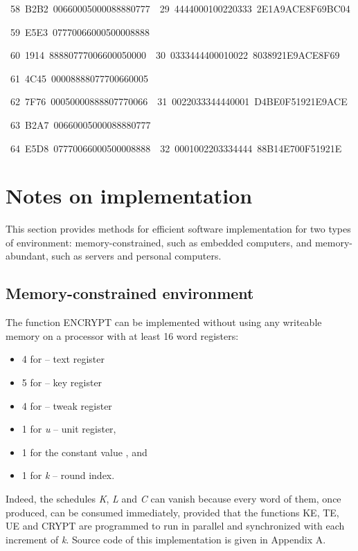 \documentclass[a4paper,oneside,english]{amsart}
\numberwithin{equation}{section}
\numberwithin{figure}{section}
\newenvironment{lyxcode}
{\par\begin{list}{}{
\setlength{\rightmargin}{\leftmargin}
\setlength{\listparindent}{0pt}\raggedright
\setlength{\itemsep}{0pt}
\setlength{\parsep}{0pt}
\normalfont\ttfamily}\item[]}
{\end{list}}
\begin{document}
\begin{table}
\begin{lyxcode}
{\footnotesize{}~58~B2B2~00660005000088880777~~29~4444000100220333~2E1A9ACE8F69BC04}{\footnotesize \par}

{\footnotesize{}~59~E5E3~07770066000500008888}{\footnotesize \par}

{\footnotesize{}~60~1914~88880777006600050000~~30~0333444400010022~8038921E9ACE8F69}{\footnotesize \par}

{\footnotesize{}~61~4C45~00008888077700660005}{\footnotesize \par}

{\footnotesize{}~62~7F76~00050000888807770066~~31~0022033344440001~D4BE0F51921E9ACE}{\footnotesize \par}

{\footnotesize{}~63~B2A7~00660005000088880777}{\footnotesize \par}

{\footnotesize{}~64~E5D8~07770066000500008888~~32~0001002203334444~88B14E700F51921E}{\footnotesize \par}

\end{lyxcode}
\end{table}



\section{Notes on implementation}

This section provides methods for efficient software implementation
for two types of environment: memory-constrained, such as embedded
computers, and memory-abundant, such as servers and personal computers.


\subsection{Memory-constrained environment}

The function ENCRYPT can be implemented without using any writeable
memory on a processor with at least 16 word registers:
\begin{itemize}
\item 4 for  -- text register
\item 5 for  -- key register
\item 4 for  -- tweak register
\item 1 for \emph{u} -- unit register, 
\item 1 for the constant value , and
\item 1 for \emph{k} -- round index.
\end{itemize}
Indeed, the schedules \emph{K}, \emph{L} and \emph{C} can vanish because
every word of them, once produced, can be consumed immediately, provided
that the functions KE, TE, UE and CRYPT are programmed to run in parallel
and synchronized with each increment of \emph{k}. Source code of this
implementation is given in Appendix A.
\end{document}

